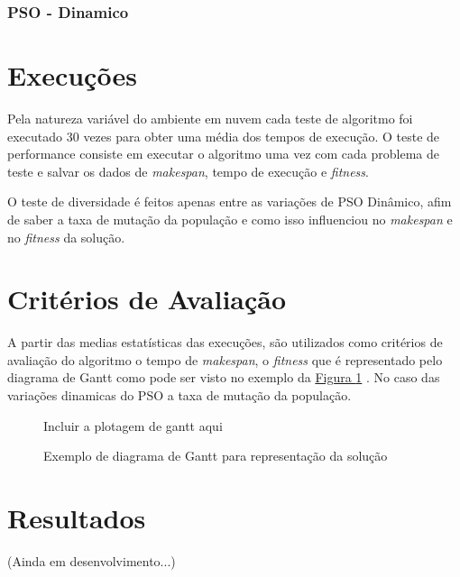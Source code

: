         \subsubsection{PSO - Dinamico}

    



\section{Execuções}
    Pela natureza variável do ambiente em nuvem cada teste de algoritmo foi executado 30 vezes para obter uma média dos tempos de execução. O teste de performance consiste em executar o algoritmo uma vez com cada problema de teste e salvar os dados de \textit{makespan}, tempo de execução e \textit{fitness}.

    O teste de diversidade é feitos apenas entre as variações de PSO Dinâmico, afim de saber a taxa de mutação da população e como isso influenciou no \textit{makespan} e no \textit{fitness} da solução.



\section{Critérios de Avaliação}
    A partir das medias estatísticas das execuções, são utilizados como critérios de avaliação do algoritmo o tempo de \textit{makespan}, o \textit{fitness} que é representado pelo diagrama de Gantt como pode ser visto no exemplo da 
    \hyperref[fig:exemplo-gantt]{Figura \ref{fig:exemplo-gantt}}
    . No caso das variações dinamicas do PSO a taxa de mutação da população.

    \begin{figure}[h]
        \centering
        \small{Incluir a plotagem de gantt aqui}
        \caption{Exemplo de diagrama de Gantt para representação da solução}
        \label{fig:exemplo-gantt}
    \end{figure}
    




\section{Resultados}
    (Ainda em desenvolvimento...)





